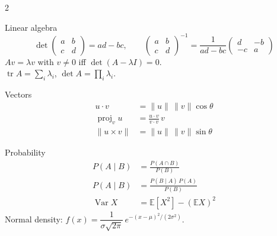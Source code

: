 \documentclass[10pt]{article}
\begin{document}
\begin{multicols}{2}
\begin{fgroup}{Linear algebra}
\[
  \det\begin{pmatrix} a & b \\ c & d \end{pmatrix} = ad - bc,
  \qquad
  \begin{pmatrix} a & b \\ c & d \end{pmatrix}^{-1}
  = \frac{1}{ad - bc}\begin{pmatrix} d & -b \\ -c & a \end{pmatrix}
\]
$Av = \lambda v$ with $v \neq 0$ iff $\det(A - \lambda I) = 0$.\\
$\operatorname{tr} A = \sum_i \lambda_i$, \quad
$\det A = \prod_i \lambda_i$.
\end{fgroup}

\begin{fgroup}{Vectors}
\begin{align*}
  u \cdot v &= \lVert u \rVert\, \lVert v \rVert \cos\theta \\
  \operatorname{proj}_v u &= \frac{u \cdot v}{v \cdot v}\, v \\
  \lVert u \times v \rVert &= \lVert u \rVert\, \lVert v \rVert \sin\theta
\end{align*}
\end{fgroup}

\begin{fgroup}{Probability}
\begin{align*}
  P(A \mid B) &= \frac{P(A \cap B)}{P(B)} \\
  P(A \mid B) &= \frac{P(B \mid A)\,P(A)}{P(B)} \\
  \operatorname{Var} X &= \mathbb{E}[X^2] - (\mathbb{E}X)^2
\end{align*}
Normal density:
$f(x) = \dfrac{1}{\sigma\sqrt{2\pi}}\,
e^{-(x - \mu)^2 / (2\sigma^2)}$.
\end{fgroup}

\end{multicols}
\end{document}
